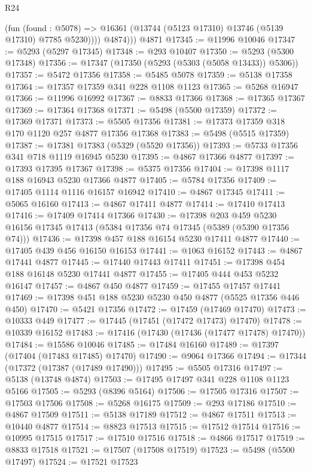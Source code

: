 \begin{lexlean}{R24}
\begin{coremodule}
            (fun (found : @5078) =>
            @16361 (@13744 (@5123 @17310) @13746 (@5139 @17310) @7785 @5230))))
          @4874)))
    @4871
@17345 := @11996 @10046
@17347 := @5293 (@5297 @17345)
@17348 := @293 @10407
@17350 := @5293 (@5300 @17348)
@17356 := @17347 (@17350 (@5293 (@5303 (@5058 @13433)) @5306))
@17357 := @5472 @17356
@17358 := @5485 @5078
@17359 := @5138 @17358
@17364 := @17357 @17359 @341 @228 @1108 @1123
@17365 := @5268 @16947
@17366 := @11996 @16992
@17367 := @8833 @17366
@17368 := @17365 @17367
@17369 := @17364 @17368
@17371 := @5498 (@5500 @17359)
@17372 := @17369 @17371
@17373 := @5505 @17356
@17381 := @17373 @17359 @318 @170 @1120 @257 @4877 @17356 @17368
@17383 := @5498 (@5515 @17359)
@17387 := @17381 @17383 (@5329 (@5520 @17356))
@17393 := @5733 @17356 @341 @718 @1119 @16945 @5230
@17395 := @4867 @17366 @4877
@17397 := @17393 @17395 @17367
@17398 := @5375 @17356
@17404 := @17398 @1117 @188 @16943 @5230 @17366 @4877
@17405 := @5784 @17356
@17409 := @17405 @1114 @1116 @16157 @16942
@17410 := @4867 @17345
@17411 := @5065 @16160
@17413 := @4867 @17411 @4877
@17414 := @17410 @17413
@17416 := @17409 @17414 @17366
@17430 := @17398
    @203
    @459
    @5230
    @16156
    @17345
    @17413
    (@5384 @17356 @74 @17345 (@5389 (@5390 @17356 @74)))
@17436 := @17398 @457 @188 @16154 @5230 @17411 @4877
@17440 := @17405 @439 @456 @16150 @16153
@17441 := @1063 @16152
@17443 := @4867 @17441 @4877
@17445 := @17440 @17443 @17411
@17451 := @17398 @454 @188 @16148 @5230 @17441 @4877
@17455 := @17405 @444 @453 @5232 @16147
@17457 := @4867 @450 @4877
@17459 := @17455 @17457 @17441
@17469 := @17398 @451 @188 @5230 @5230 @450 @4877 (@5525 @17356 @446 @450)
@17470 := @5421 @17356
@17472 := @17459 (@17469 @17470)
@17473 := @10333 @449
@17477 := @17445 (@17451 (@17472 @17473) @17470)
@17478 := @10339 @16152
@17483 := @17416 (@17430 (@17436 (@17477 @17478) @17470))
@17484 := @15586 @10046
@17485 := @17484 @16160
@17489 := @17397 (@17404 (@17483 @17485) @17470)
@17490 := @9064 @17366
@17494 := @17344 (@17372 (@17387 (@17489 @17490)))
@17495 := @5505 @17316
@17497 := @5138 (@13748 @4874)
@17503 := @17495 @17497 @341 @228 @1108 @1123 @5166
@17505 := @5293 (@8396 @5164)
@17506 := @17505 @17316
@17507 := @17503 @17506
@17508 := @5268 @16175
@17509 := @293 @17186
@17510 := @4867 @17509
@17511 := @5138 @17189
@17512 := @4867 @17511
@17513 := @10440 @4877
@17514 := @8823 @17513
@17515 := @17512 @17514
@17516 := @10995 @17515
@17517 := @17510 @17516
@17518 := @4866 @17517
@17519 := @8833 @17518
@17521 := @17507 (@17508 @17519)
@17523 := @5498 (@5500 @17497)
@17524 := @17521 @17523

\end{coremodule}
\end{lexlean}
